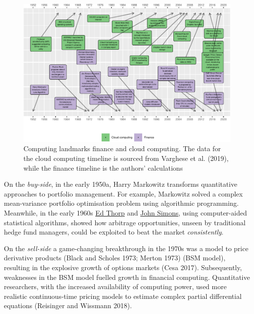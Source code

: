 \documentclass{article}
\begin{document}
\begin{figure}

{\centering \includegraphics[width=1\linewidth]{qrap_paper_files/figure-latex/timeline-1} 

}

\caption{ Computing landmarks finance and cloud computing.   The data for the cloud computing timeline is sourced from Varghese et al. (2019), while the finance timeline is the authors' calculations}\label{fig:timeline}
\end{figure}

On the \emph{buy-side}, in the early 1950a, Harry Markowitz transforms
quantitative approaches to portfolio management. For example, Markowitz
solved a complex mean-variance portfolio optimisation problem using
algorithmic programming. Meanwhile, in the early 1960s
\href{https://en.wikipedia.org/wiki/Edward_O._Thorp}{Ed Thorp} and
\href{https://en.wikipedia.org/wiki/Jim_Simons_(mathematician)}{John
Simons}, using computer-aided statistical algorithms, showed how
arbitrage opportunities, unseen by traditional hedge fund managers,
could be exploited to beat the market \emph{consistently}.

On the \emph{sell-side} a game-changing breakthrough in the 1970s was a
model to price derivative products (Black and Scholes 1973; Merton 1973)
(BSM model), resulting in the explosive growth of options markets (Cesa
2017). Subsequently, weaknesses in the BSM model fuelled growth in
financial computing. Quantitative researchers, with the increased
availability of computing power, used more realistic continuous-time
pricing models to estimate complex partial differential equations
(Reisinger and Wissmann 2018).
\end{document}
